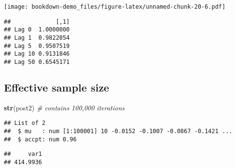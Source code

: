 \documentclass[
]{book}
\newenvironment{Shaded}{\begin{snugshade}}{\end{snugshade}}
\newcommand{\CommentTok}[1]{\textcolor[rgb]{0.56,0.35,0.01}{\textit{#1}}}
\newcommand{\KeywordTok}[1]{\textcolor[rgb]{0.13,0.29,0.53}{\textbf{#1}}}
\newcommand{\NormalTok}[1]{#1}
\newcommand{\OperatorTok}[1]{\textcolor[rgb]{0.81,0.36,0.00}{\textbf{#1}}}
\begin{document}
\begin{Shaded}
\end{Shaded}

\texttt{[image: bookdown-demo\_files/figure-latex/unnamed-chunk-20-6.pdf]}

\begin{Shaded}
\end{Shaded}

\begin{verbatim}
##             [,1]
## Lag 0  1.0000000
## Lag 1  0.9822054
## Lag 5  0.9507519
## Lag 10 0.9131846
## Lag 50 0.6545171
\end{verbatim}

\hypertarget{effective-sample-size}{%
\subsection{Effective sample size}\label{effective-sample-size}}

\begin{Shaded}
\begin{Highlighting}[]
\KeywordTok{str}\NormalTok{(post2) }\CommentTok{# contains 100,000 iterations}
\end{Highlighting}
\end{Shaded}

\begin{verbatim}
## List of 2
##  $ mu   : num [1:100001] 10 -0.0152 -0.1007 -0.0867 -0.1421 ...
##  $ accpt: num 0.96
\end{verbatim}

\begin{Shaded}
\end{Shaded}

\begin{verbatim}
##     var1 
## 414.9936
\end{verbatim}
\end{document}
